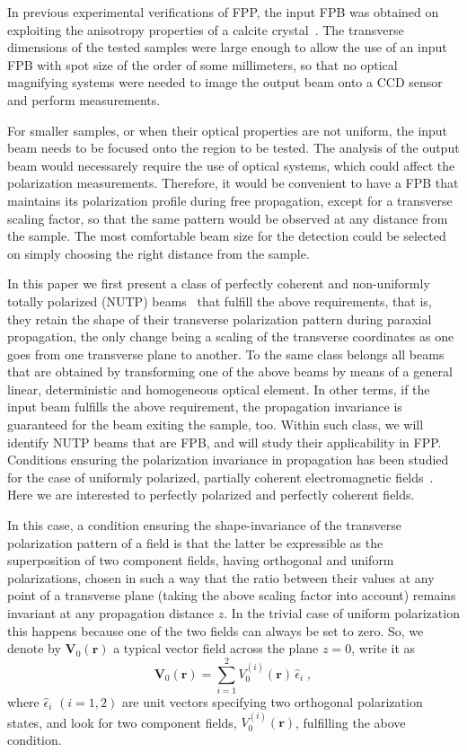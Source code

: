 \documentclass{article}
\newcommand{\bs}{\boldsymbol}
\begin{document}
In previous experimental verifications of FPP, the input FPB was obtained on exploiting the anisotropy properties of a calcite crystal~\cite{SUAREZBERMEJO:OLEN19,Piquero:JOPT18}. The transverse dimensions of the tested samples were large enough to allow the use of an input FPB with spot size of the order of some millimeters, so that no optical magnifying systems were needed to image the output beam onto a CCD sensor and perform measurements.

For smaller samples, or when their optical properties are not uniform, the input beam needs to be focused onto the region to be tested. The analysis of the output beam would necessarely require the use of optical systems, which could affect the polarization measurements. Therefore, it would be convenient to have a FPB that maintains its polarization profile during free propagation, except for a transverse scaling factor, so that the same pattern would be observed at any distance from the sample. The most comfortable beam size for the detection could be selected on simply choosing the right distance from the sample.

In this paper we first present a class of perfectly coherent and non-uniformly totally polarized (NUTP) beams~\cite{Piquero:JOSAA20} that fulfill the above requirements, that is, they retain the shape of their transverse polarization pattern during paraxial propagation, the only change being a scaling of the transverse coordinates as one goes from one transverse plane to another. To the same class belongs all beams that are obtained by transforming one of the above beams by means of a general linear, deterministic and homogeneous optical element. In other terms, if the input beam fulfills the above requirement, the propagation invariance is guaranteed for the beam exiting the sample, too. Within such class, we will identify NUTP beams that are FPB, and will study their applicability in FPP. Conditions ensuring the polarization invariance in propagation has been studied for the case of uniformly polarized, partially coherent electromagnetic fields~\cite{Wolf:OL07,Korotkova:OL11,RMH:OC07}. Here we are interested to perfectly polarized and perfectly coherent fields. 

In this case, a condition ensuring the shape-invariance of the transverse polarization pattern of a field is that the latter be expressible as the superposition of two component fields, having orthogonal and uniform polarizations, chosen in such a way that the ratio between their values at any point of a transverse plane (taking the above scaling factor into account) remains invariant at any propagation distance $z$. In the trivial case of uniform polarization this happens because one of the two fields can always be set to zero.
 So, we denote by ${\bs V}_{0}({\bs r}) $ a typical vector field across the plane $z=0$, write it as
%
\begin{equation}
{\bs V}_{0}({\bs r}) 
= 
\displaystyle\sum_{i=1}^2
V^{(i)}_{0} ({\bs r})  \, {\hat \epsilon}_i
\; ,
\label{super}
\end{equation}
%
where ${\hat \epsilon}_i$ $(i=1,2)$ are unit vectors specifying two orthogonal polarization states,  and look for  two component fields, $V^{(i)}_{0} ({\bs r})$, fulfilling the above condition. 
\end{document}
